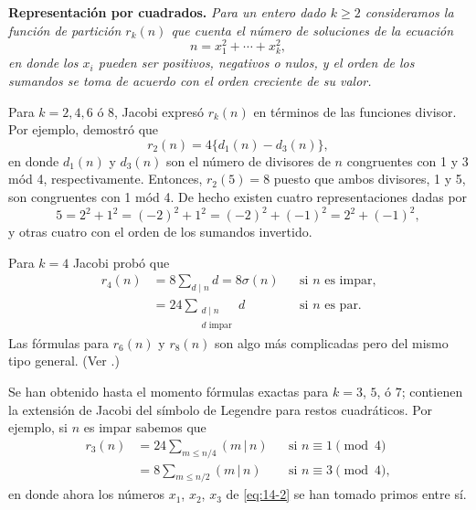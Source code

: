 \documentclass[12pt,a4paper]{book}
\begin{document}
    \textbf{Representación por cuadrados.} \textit{Para un entero dado $k\geq2$ consideramos la
    función de partición $r_{k}(n)$ que cuenta el número de soluciones de la ecuación}
    \begin{equation}\label{eq:14-2}
        n=x_{1}^{2}+\cdots+x_{k}^{2},
    \end{equation}
    \textit{en donde los $x_{i}$ pueden ser positivos, negativos o nulos, y el orden de los
    sumandos se toma de acuerdo con el orden creciente de su valor.}

    Para $k=2,4,6$ ó $8$, Jacobi \cite{jacobi1829} expresó $r_{k}(n)$ en términos de las funciones
    divisor. Por ejemplo, demostró que
    \begin{equation*}
        r_{2}(n)=4\{d_{1}(n)-d_{3}(n)\},
    \end{equation*}
    en donde $d_{1}(n)$ y $d_{3}(n)$ son el número de divisores de $n$ congruentes con 1 y 3 mód 4,
    respectivamente. Entonces, $r_{2}(5)=8$ puesto que ambos divisores, 1 y 5, son congruentes
    con 1 mód 4. De hecho existen cuatro representaciones dadas por
    \begin{equation*}
        5=2^{2}+1^{2}=(-2)^{2}+1^{2}=(-2)^{2}+(-1)^{2}=2^{2}+(-1)^{2},
    \end{equation*}
    y otras cuatro con el orden de los sumandos invertido.

    Para $k=4$ Jacobi probó que
    \begin{align*}
        r_{4}(n)&=8\sum_{d\mid n}d=8\sigma(n)&&\text{si }n\text{ es impar,}\\
        &=24\sum_{\substack{d\mid n\\d\text{ impar}}}d&&\text{si }n\text{ es par.}
    \end{align*}
    Las fórmulas para $r_{6}(n)$ y $r_{8}(n)$ son algo más complicadas pero del mismo tipo general.
    (Ver \cite{dickson1930}.)

    Se han obtenido hasta el momento fórmulas exactas para $k=3$, $5$, ó $7$; contienen la
    extensión de Jacobi del símbolo de Legendre para restos cuadráticos. Por ejemplo, si $n$ es
    impar sabemos que
    \begin{align*}
        r_{3}(n)&=24\sum_{m\leq n/4}(m\,|\,n)&&\text{si }n\equiv1\pmod{4}\\
        &=8\sum_{m\leq n/2}(m\,|\,n)&&\text{si }n\equiv3\pmod{4},
    \end{align*}
    en donde ahora los números $x_{1}$, $x_{2}$, $x_{3}$ de \eqref{eq:14-2} se han tomado primos entre
    sí.
\end{document}
